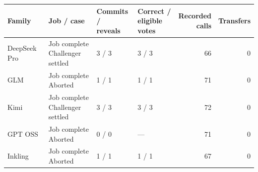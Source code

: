 \begin{tabular}{llllrr}
\toprule
Family & Job / case & \shortstack[l]{Commits /\\reveals} & \shortstack[l]{Correct /\\eligible votes} & \shortstack[r]{Recorded\\calls} & Transfers\\
\midrule
DeepSeek Pro & \shortstack[l]{Job complete\\Challenger settled} & 3 / 3 & 3 / 3 & 66 & 0\\
GLM & \shortstack[l]{Job complete\\Aborted} & 1 / 1 & 1 / 1 & 71 & 0\\
Kimi & \shortstack[l]{Job complete\\Challenger settled} & 3 / 3 & 3 / 3 & 72 & 0\\
GPT OSS & \shortstack[l]{Job complete\\Aborted} & 0 / 0 & --- & 71 & 0\\
Inkling & \shortstack[l]{Job complete\\Aborted} & 1 / 1 & 1 / 1 & 67 & 0\\
\bottomrule
\end{tabular}
